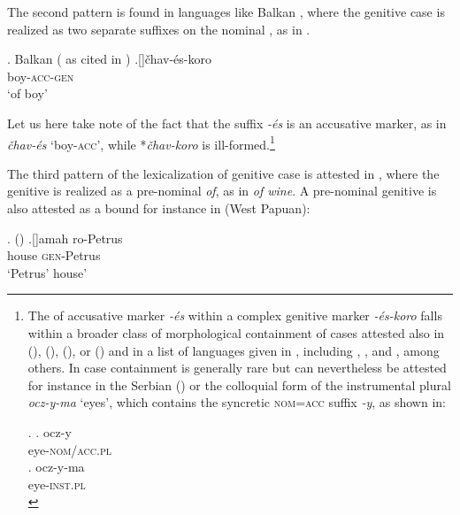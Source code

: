 \noindent The second pattern is found in languages like Balkan , where the genitive case is realized as two separate suffixes on the nominal , as in \Next. 



\ex.  Balkan  (\citealt[57]{Friedman1991} as cited in \citealt{Caha2011})
\ag.[]\hspace{-20pt}\v{c}hav-\'es-koro\\
\hspace{-20pt}boy-\textsc{acc-gen}\\
\hspace{-20pt}`of boy' 

Let us here take note of the fact that the suffix \textit{-\'es} is an accusative marker, as in \textit{\v{c}hav-\'es} `boy-\textsc{acc}', while *\textit{\v{c}hav-koro} is ill-formed.\footnote{The  of accusative marker \textit{-\'es} within a complex genitive marker \textit{-\'es-koro} falls within a broader class of morphological containment of cases attested also in  
 (\citealt{Nichols1994}),  (\citealt{Blevins2008}),  (\citealt{Plakendorf2007}), or  (\citealt{Schmitt1981,Caha2013}) and in a list of languages given in \cite{Plank1999}, including , , and , among others. In  case containment is generally rare but can nevertheless be attested for instance in the Serbian  (\citealt{Caha2011b}) or the colloquial form of the  instrumental plural \textit{ocz-y-ma} `eyes', which contains the syncretic \textsc{nom=acc} suffix \textit{-y}, as shown in: 

\ex. 
\ag. ocz-y\\
eye-\textsc{nom/acc.pl}\\
\bg. ocz-y-ma\\
eye-\textsc{inst.pl}\\

} %
\par
The third pattern of the lexicalization of genitive case is attested in , where the genitive is realized as a pre-nominal \textit{of}, as in \textit{of wine}. A pre-nominal genitive is also attested as a bound  for instance in  (West Papuan):

\ex.  (\citealt[97]{Dol1999})
\ag.[]\hspace{-20pt}amah ro-Petrus\\
\hspace{-20pt}house \textsc{gen}-Petrus\\
\hspace{-20pt}`Petrus' house'


